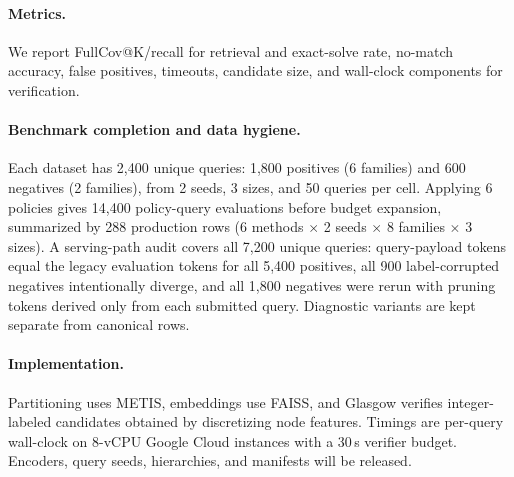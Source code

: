\documentclass[runningheads]{llncs}
\begin{document}
\begin{table}[tb]
\centering
\caption{\textbf{Partition balance.} Coarse partitions are ranked by retrieval; fine partitions support local overlap and bridge construction. Node counts are per partition.}
\label{tab:partition_sizes}
\resizebox{\textwidth}{!}{}
\end{table}

\begin{table}[tb]
\centering
\caption{\textbf{Overlap expansion scale.} The operator adds boundary nodes of edge-sharing partitions, not whole neighboring partitions; the loose union bound is never materialized.}
\label{tab:partition_overlap}
\footnotesize
\resizebox{\textwidth}{!}{}
\end{table}

\paragraph{Metrics.}
We report FullCov@K/recall for retrieval and exact-solve rate, no-match accuracy, false positives, timeouts, candidate size, and wall-clock components for verification.

\paragraph{Benchmark completion and data hygiene.}
Each dataset has 2,400 unique queries: 1,800 positives (6 families) and 600 negatives (2 families), from 2 seeds, 3 sizes, and 50 queries per cell. Applying 6 policies gives 14,400 policy-query evaluations before budget expansion, summarized by 288 production rows (6 methods $\times$ 2 seeds $\times$ 8 families $\times$ 3 sizes). A serving-path audit covers all 7,200 unique queries: query-payload tokens equal the legacy evaluation tokens for all 5,400 positives, all 900 label-corrupted negatives intentionally diverge, and all 1,800 negatives were rerun with pruning tokens derived only from each submitted query. Diagnostic variants are kept separate from canonical rows.

\paragraph{Implementation.} Partitioning uses METIS, embeddings use FAISS, and Glasgow verifies integer-labeled candidates obtained by discretizing node features. Timings are per-query wall-clock on 8-vCPU Google Cloud instances with a 30\,s verifier budget. Encoders, query seeds, hierarchies, and manifests will be released.
\end{document}
